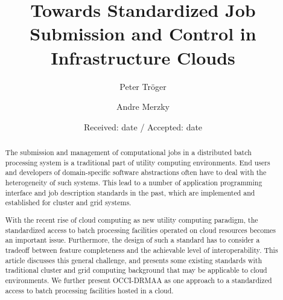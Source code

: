 \documentclass[twocolumn]{svjour3}       %
\begin{document}
\title{Towards Standardized Job Submission and Control in Infrastructure Clouds}
\author{Peter Tr\"oger \and Andre Merzky}

\date{Received: date / Accepted: date}

\maketitle

\makeglossaries


\begin{abstract}
The submission and management of computational jobs in a distributed batch processing system is a traditional part of utility computing environments. End users and developers of domain-specific software abstractions often have to deal with the heterogeneity of such systems. This lead to a number of application programming interface and job description standards in the past, which are implemented and established for cluster and grid systems.

With the recent rise of cloud computing as new utility computing paradigm, the standardized access to batch processing facilities operated on cloud resources becomes an important issue. Furthermore, the design of such a standard has to consider a tradeoff between feature completeness and the achievable level of interoperability. This article discusses this general challenge, and presents some existing standards with traditional cluster and grid computing background that may be applicable to cloud environments. We further present OCCI-DRMAA as one approach to a standardized access to batch processing facilities hosted in a cloud. 
\end{abstract}
\end{document}
